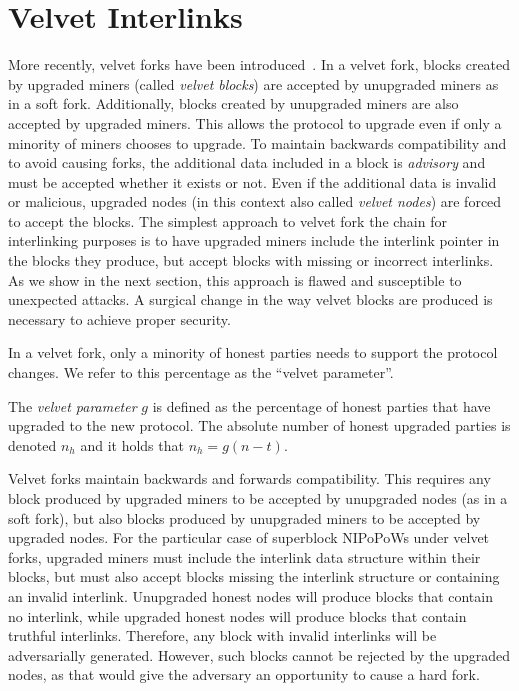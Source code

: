 \section{Velvet Interlinks}\label{sec:velvet}
More recently, velvet forks have been introduced~\cite{velvet}. In a
velvet fork, blocks created by upgraded miners (called \emph{velvet blocks}) are
accepted by unupgraded miners as in a soft fork. Additionally, blocks created by
unupgraded miners are also accepted by upgraded miners. This allows the protocol
to upgrade even if only a minority of miners chooses to upgrade. To maintain
backwards compatibility and to avoid causing forks, the additional data included
in a block is \emph{advisory} and must be accepted whether it exists or not.
Even if the additional data is invalid or malicious, upgraded nodes (in this
context also called \emph{velvet nodes}) are forced to accept the blocks. The
simplest approach to velvet fork the chain for interlinking purposes is to have
upgraded miners include the interlink pointer in the blocks they produce, but
accept blocks with missing or incorrect interlinks. As we show in the next
section, this approach is flawed and susceptible to unexpected attacks. A
surgical change in the way velvet blocks are produced is necessary to achieve
proper security.

In a velvet fork, only a minority of honest parties needs to support the protocol
changes. We refer to this percentage as the ``velvet parameter''.

\begin{definition}
	The \emph{velvet parameter} $g$ is defined as the percentage of honest parties
	that have upgraded to the new protocol. The absolute number of honest upgraded
	parties is denoted $n_h$ and it holds that
	$n_h = g (n - t)$.
	\label{defn:velvet_honest_majority}
\end{definition}

Velvet forks maintain backwards and forwards compatibility. This requires any block produced by upgraded miners to be accepted by unupgraded nodes (as in a soft fork), but also blocks produced by unupgraded miners to be accepted by upgraded nodes. For the particular case of superblock NIPoPoWs under velvet forks, upgraded miners must include the interlink data structure within their blocks, but must also accept blocks missing the interlink structure or containing an invalid interlink. Unupgraded honest nodes will produce blocks that contain no interlink, while upgraded honest nodes will produce blocks that contain truthful interlinks. Therefore, any block with invalid interlinks will be adversarially generated. However, such blocks cannot be rejected by the upgraded nodes, as that would give the adversary an opportunity to cause a hard fork.

